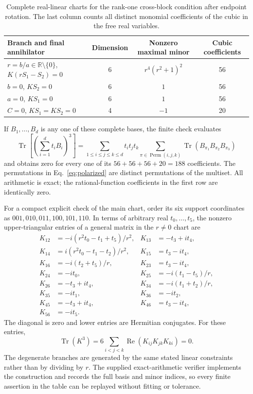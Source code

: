 \documentclass[aps,pra,reprint,onecolumn,superscriptaddress]{revtex4-2}
\newcommand{\Tr}{\operatorname{Tr}}
\begin{document}
\begin{table}[ht]
\caption{\label{tab:charts}Complete real-linear charts for the rank-one cross-block condition after endpoint rotation. The last column counts all distinct monomial coefficients of the cubic in the free real variables.}
\begin{ruledtabular}
\begin{tabular}{lccc}
Branch and final annihilator&Dimension&Nonzero maximal minor&Cubic coefficients\\
\hline
\(r=b/a\in\mathbb R\setminus\{0\}\), \(K(rS_1-S_2)=0\)&6&\(r^4(r^2+1)^2\)&56\\
\(b=0\), \(KS_2=0\)&6&\(1\)&56\\
\(a=0\), \(KS_1=0\)&6&\(1\)&56\\
\(C=0\), \(KS_1=KS_2=0\)&4&\(-1\)&20
\end{tabular}
\end{ruledtabular}
\end{table}

If \(B_1,\ldots,B_d\) is any one of these complete bases, the finite check evaluates
\begin{equation}
 \Tr\!\left[\left(\sum_{i=1}^d t_iB_i\right)^3\right]
 =\sum_{1\le i\le j\le k\le d}
 t_i t_j t_k
 \sum_{\pi\in\operatorname{Perm}(i,j,k)}
 \Tr(B_{\pi_1}B_{\pi_2}B_{\pi_3})
 \label{eq:polarized}
\end{equation}
and obtains zero for every one of its \(56+56+56+20=188\) coefficients. The permutations in Eq.~\eqref{eq:polarized} are distinct permutations of the multiset. All arithmetic is exact; the rational-function coefficients in the first row are identically zero.

For a compact explicit check of the main chart, order its six support coordinates as \(001,010,011,100,101,110\). In terms of arbitrary real \(t_0,\ldots,t_5\), the nonzero upper-triangular entries of a general matrix in the \(r\ne0\) chart are
\begin{align*}
 K_{12}&=-i(r^2t_0-t_1+t_5)/r^2,&
 K_{13}&=-t_3+it_4,\\
 K_{14}&=i(r^2t_0-t_1-t_2)/r^2,&
 K_{15}&=t_3-it_4,\\
 K_{16}&=-i(t_2+t_5)/r,&
 K_{23}&=t_3-it_4,\\
 K_{24}&=-it_0,&
 K_{25}&=-i(t_1-t_5)/r,\\
 K_{26}&=-t_3+it_4,&
 K_{34}&=-i(t_1+t_2)/r,\\
 K_{35}&=-it_1,&
 K_{36}&=-it_2,\\
 K_{45}&=-t_3+it_4,&
 K_{46}&=t_3-it_4,\\
 K_{56}&=-it_5.
\end{align*}
The diagonal is zero and lower entries are Hermitian conjugates. For these entries,
\begin{equation*}
\Tr(K^3)=6\sum_{i<j<k}\operatorname{Re}(K_{ij}K_{jk}K_{ki})=0.
\end{equation*}
The degenerate branches are generated by the same stated linear constraints rather than by dividing by \(r\). The supplied exact-arithmetic verifier implements the construction and records the full basis and minor indices, so every finite assertion in the table can be replayed without fitting or tolerance.
\end{document}
